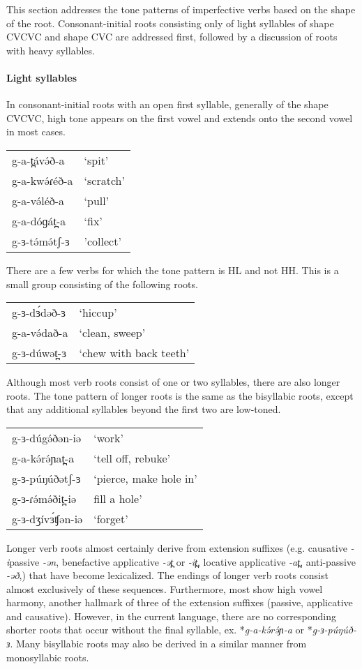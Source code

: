 This section addresses the tone patterns of imperfective verbs based on the shape of the root. Consonant-initial roots consisting only of light syllables of shape CVCVC and shape CVC are addressed first, followed by a discussion of roots with heavy syllables.


\paragraph{Light syllables} In consonant-initial roots with an open first syllable, generally of the shape CVCVC, high tone appears on the first vowel and extends onto the second vowel in most cases.

\ea \begin{tabular}[t]{ll}	
g-a-t̪ávə́ð-a	&‘spit’\\
g-a-kwə́ɾéð-a&	‘scratch’\\
g-a-və́léð-a	&‘pull’\\
g-a-dóɡát̪-a	&‘fix’\\
g-ɜ-tə́mə́tʃ-ɜ&	'collect'\\
\end{tabular}\z 
There are a few verbs for which the tone pattern is HL and not HH. This is a small group consisting of the following roots. 
\ea 	
\begin{tabular}[t]{ll}
g-ɜ-dɜ́dəð-ɜ	&	`hiccup'\\
g-a-və́dað-a	&	‘clean, sweep'\\
g-ɜ-dúwət̪-ɜ	&	`chew with back teeth' \\	
\end{tabular}
\z 

Although most verb roots consist of one or two syllables, there are also longer roots. The tone pattern of longer roots is the same as the bisyllabic roots, except that any additional syllables beyond the first two are low-toned.

\ea 	
\begin{tabular}[t]{ll}
g-ɜ-dúgə́ðən-iə	&	`work'\\
g-a-kə́rə́ɲat̪-a		&	`tell off, rebuke'\\
g-ɜ-púŋúðətʃ-ɜ	&	`pierce, make hole in'\\
g-ɜ-ɾə́mə́ðit̪-iə		&	fill a hole'\\
g-ɜ-dʒívɜ́ʧən-iə	&	`forget'\\	
\end{tabular}
\z 
Longer verb roots almost certainly derive from extension suffixes (e.g. causative \textit{-i}passive \textit{-ən}, benefactive applicative \textit{-ət̪} or \textit{-it̪}, locative applicative \textit{-at̪}, anti-passive \textit{-əð},) that have become lexicalized. The endings of longer verb roots consist almost exclusively of these sequences. Furthermore, most show high vowel harmony, another hallmark of three of the extension suffixes (passive, applicative and causative). However, in the current language, there are no corresponding shorter roots that occur without the final syllable, ex. *\textit{g-a-kə́rə́ɲ-a} or *\textit{g-ɜ-púŋúð-ɜ}. Many bisyllabic roots may also be derived in a similar manner from monosyllabic roots. 

